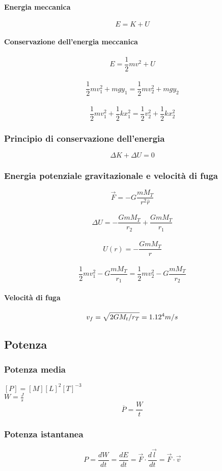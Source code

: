 \documentclass[a4paper,12pt]{article}
\theoremstyle{mystyle}
\begin{document}
\paragraph{Energia meccanica}
\[E=K+U\]
\paragraph{Conservazione dell'energia meccanica}
\[E = \frac{1}{2}mv^2 + U \]\\
\[\frac{1}{2}m v_1^2 + mgy_1 = \frac{1}{2}mv_2^2+mgy_2\]\\
\[\frac{1}{2} mv_1^2+ \frac{1}{2} k x_1^2 = \frac{1}{2}v_2^2 + \frac{1}{2}k x_2^2\]
\subsubsection{Principio di conservazione dell'energia}
\[\Delta K + \Delta U = 0\]
\subsubsection{Energia potenziale gravitazionale e velocità di fuga}
\[\vec F = - G \frac{mM_T}{r^2 \hat r}\]\\
\[\Delta U = - \frac{GmM_T}{r_2}+ \frac{GmM_T}{r_1} \]\\
\[U(r) = - \frac{GmM_T}{r}\]\\
\[\frac{1}{2}mv_1^2 - G \frac{mM_T}{r_1}= \frac{1}{2}mv_2^2- G \frac{mM_T}{r_2}\]
\paragraph{Velocità di fuga}
\[v_f = \sqrt{2 G M_t / r_T} = 1.12 \time 10^4 m/s\]

\subsection{Potenza}
\subsubsection{Potenza media}
\([P]=[M][L]^2[T]^{-3}\)\\
\(W=\frac{J}{s}\)\\
\[\overline P = \frac{W}{t}\]

\subsubsection{Potenza istantanea}
\[P = \frac{dW}{dt} = \frac{dE}{dt} = \vec F \cdot \frac{d \vec l}{dt} = \vec F \cdot \vec v\]
\end{document}
